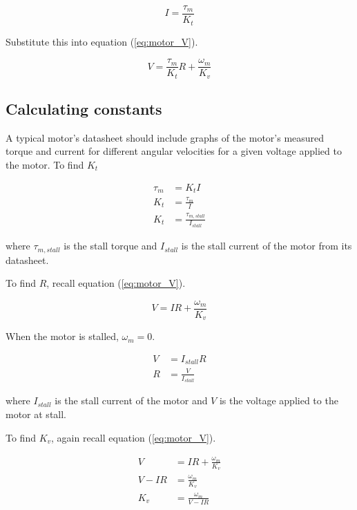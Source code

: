 \begin{equation*}
  I = \frac{\tau_m}{K_t}
\end{equation*}

Substitute this into equation (\ref{eq:motor_V}).

\begin{equation}
  V = \frac{\tau_m}{K_t} R + \frac{\omega_m}{K_v} \label{eq:motor_tau_V}
\end{equation}

\subsection{Calculating constants}

A typical motor's datasheet should include graphs of the motor's measured torque
and current for different angular velocities for a given voltage applied to the
motor. To find $K_t$

\begin{align}
  \tau_m &= K_t I \nonumber \\
  K_t &= \frac{\tau_m}{I} \nonumber \\
  K_t &= \frac{\tau_{m,stall}}{I_{stall}}
\end{align}

where $\tau_{m,stall}$ is the stall torque and $I_{stall}$ is the stall current
of the motor from its datasheet.

To find $R$, recall equation (\ref{eq:motor_V}).

\begin{equation*}
  V = IR + \frac{\omega_m}{K_v}
\end{equation*}

When the motor is stalled, $\omega_m = 0$.

\begin{align}
  V &= I_{stall} R \nonumber \\
  R &= \frac{V}{I_{stall}}
\end{align}

where $I_{stall}$ is the stall current of the motor and $V$ is the voltage
applied to the motor at stall.

To find $K_v$, again recall equation (\ref{eq:motor_V}).

\begin{align*}
  V &= IR + \frac{\omega_m}{K_v} \\
  V - IR &= \frac{\omega_m}{K_v} \\
  K_v &= \frac{\omega_m}{V - IR}
\end{align*}

